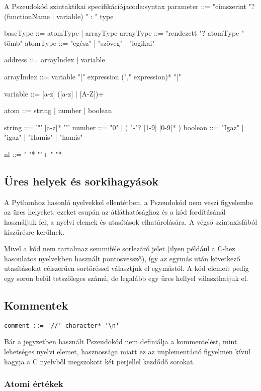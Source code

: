 \begin{code}{A Pszeudokód szintaktikai specifikációja}{code:syntax}
parameter ::= "címszerint "? (functionName | variable) " : " type

baseType ::= atomType | arrayType
arrayType ::= "rendezett "? atomType " tömb"
atomType ::= "egész" | "szöveg" | "logikai"

address ::= arrayIndex | variable

arrayIndex ::= variable "[" expression ("," expression)* "]"

variable ::= [a-z] ([a-z] | [A-Z])+

atom ::= string | number | boolean

string ::= '"' [a-z]* '"'
number ::= "0" | ( "-"? [1-9] [0-9]* )
boolean ::= "Igaz" | "igaz" | "Hamis" | "hamis"

nl ::= " "* "\n"+ " "*

\end{code}
\fi

\subsection{Üres helyek és sorkihagyások}

A Pythonhoz hasonló nyelvekkel ellentétben, a Pszeudokód nem veszi figyelembe az üres helyeket, ezeket csupán az átláthatósághoz és a kód fordításánál használjuk fel, a nyelvi elemek és utasítások elhatárolására. A végső szintaxisfából kiszűrésre kerülnek.

Mivel a kód nem tartalmaz semmiféle sorlezáró jelet (ilyen például a C-hez hasonlatos nyelvekben használt pontosvessző), így az egymás után következő utasításokat célszerűen sortöréssel választjuk el egymástól. A kód elemeit pedig egy soron belül tetszőleges számú, de legalább egy üres hellyel választhatjuk el.

\subsection{Kommentek}

\begin{footnotesize}
\begin{verbatim}
comment ::= '//' character* '\n'
\end{verbatim}
\end{footnotesize}

Bár a jegyzetben használt Pszeudokód nem definiálja a kommentelést, mint lehetséges nyelvi elemet, hasznossága miatt ez az implementáció figyelmen kívül hagyja a C nyelvből megszokott két perjellel kezdődő sorokat.

\subsubsection{Atomi értékek}

